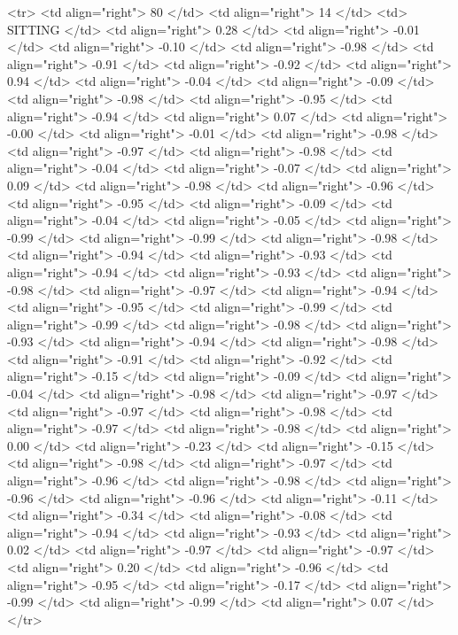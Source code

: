   <tr> <td align="right"> 80 </td> <td align="right">  14 </td> <td> SITTING </td> <td align="right"> 0.28 </td> <td align="right"> -0.01 </td> <td align="right"> -0.10 </td> <td align="right"> -0.98 </td> <td align="right"> -0.91 </td> <td align="right"> -0.92 </td> <td align="right"> 0.94 </td> <td align="right"> -0.04 </td> <td align="right"> -0.09 </td> <td align="right"> -0.98 </td> <td align="right"> -0.95 </td> <td align="right"> -0.94 </td> <td align="right"> 0.07 </td> <td align="right"> -0.00 </td> <td align="right"> -0.01 </td> <td align="right"> -0.98 </td> <td align="right"> -0.97 </td> <td align="right"> -0.98 </td> <td align="right"> -0.04 </td> <td align="right"> -0.07 </td> <td align="right"> 0.09 </td> <td align="right"> -0.98 </td> <td align="right"> -0.96 </td> <td align="right"> -0.95 </td> <td align="right"> -0.09 </td> <td align="right"> -0.04 </td> <td align="right"> -0.05 </td> <td align="right"> -0.99 </td> <td align="right"> -0.99 </td> <td align="right"> -0.98 </td> <td align="right"> -0.94 </td> <td align="right"> -0.93 </td> <td align="right"> -0.94 </td> <td align="right"> -0.93 </td> <td align="right"> -0.98 </td> <td align="right"> -0.97 </td> <td align="right"> -0.94 </td> <td align="right"> -0.95 </td> <td align="right"> -0.99 </td> <td align="right"> -0.99 </td> <td align="right"> -0.98 </td> <td align="right"> -0.93 </td> <td align="right"> -0.94 </td> <td align="right"> -0.98 </td> <td align="right"> -0.91 </td> <td align="right"> -0.92 </td> <td align="right"> -0.15 </td> <td align="right"> -0.09 </td> <td align="right"> -0.04 </td> <td align="right"> -0.98 </td> <td align="right"> -0.97 </td> <td align="right"> -0.97 </td> <td align="right"> -0.98 </td> <td align="right"> -0.97 </td> <td align="right"> -0.98 </td> <td align="right"> 0.00 </td> <td align="right"> -0.23 </td> <td align="right"> -0.15 </td> <td align="right"> -0.98 </td> <td align="right"> -0.97 </td> <td align="right"> -0.96 </td> <td align="right"> -0.98 </td> <td align="right"> -0.96 </td> <td align="right"> -0.96 </td> <td align="right"> -0.11 </td> <td align="right"> -0.34 </td> <td align="right"> -0.08 </td> <td align="right"> -0.94 </td> <td align="right"> -0.93 </td> <td align="right"> 0.02 </td> <td align="right"> -0.97 </td> <td align="right"> -0.97 </td> <td align="right"> 0.20 </td> <td align="right"> -0.96 </td> <td align="right"> -0.95 </td> <td align="right"> -0.17 </td> <td align="right"> -0.99 </td> <td align="right"> -0.99 </td> <td align="right"> 0.07 </td> </tr>
